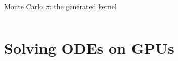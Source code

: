 \documentclass[@BEAMER_OPTIONS@]{beamer}
\begin{document}
\begin{frame}[fragile]{Monte Carlo $\pi$: the generated kernel}
\begin{columns}
\begin{column}[t]{0.2\textwidth}
\begin{exampleblock}{}
\begin{adjustbox}{width=0.30\textwidth, height=\textheight, keepaspectratio}
                \end{adjustbox}
            \end{exampleblock}
        \end{column}
        \begin{column}[t]{0.3\textwidth}
            \begin{exampleblock}{}
                \begin{adjustbox}{width=0.30\textwidth, height=\textheight, keepaspectratio}
                    \begin{minipage}{\textwidth}
                        
                    \end{minipage}
                \end{adjustbox}
            \end{exampleblock}
        \end{column}
    \end{columns}
\end{frame}

\note{}

\section{Solving ODEs on GPUs}
\begin{frame}
    \sectionpage
\end{frame}
\end{document}
